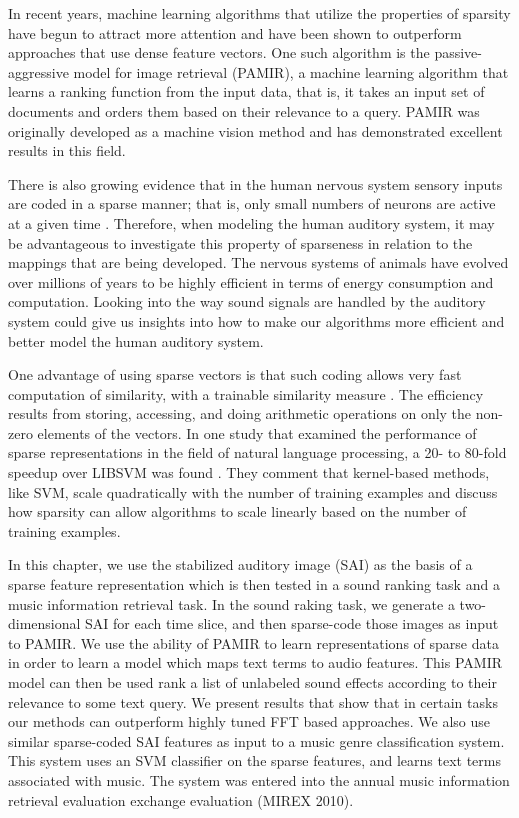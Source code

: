 In recent years, machine learning algorithms that utilize the properties of 
sparsity have begun to attract more attention and have been shown to 
outperform approaches that use dense feature vectors.  One such algorithm is 
the passive-aggressive model for image retrieval (PAMIR), a machine
learning algorithm that learns a ranking function from the input data,
that is, it takes an input set of documents and orders them based on
their relevance to a query. PAMIR was originally developed as a machine
vision method and has demonstrated excellent results in this field.

There is also growing evidence that in the human nervous
system sensory inputs are coded in a sparse manner; that is, only
small numbers of neurons are active at a given time
\cite{olshausen2004}.  Therefore, when modeling the human auditory
system, it may be advantageous to investigate this property of
sparseness in relation to the mappings that are being developed. The
nervous systems of animals have evolved over millions of years to be
highly efficient in terms of energy consumption and computation. 
Looking into the way sound signals are handled by the auditory
system could give us insights into how to make our algorithms more
efficient and better model the human auditory system.

One advantage of using sparse vectors is that such coding allows very fast
computation of similarity, with a trainable similarity measure 
\cite{chechik2010}. The efficiency results from storing, accessing, and doing 
arithmetic operations on only the non-zero elements of the vectors.   
In one study that examined the performance of sparse
representations in the field of natural language processing, a 20- to
80-fold speedup over LIBSVM was found \cite{haffner2006}.  They
comment that kernel-based methods, like SVM, scale quadratically with
the number of training examples and discuss how sparsity can allow
algorithms to scale linearly based on the number of training examples.

In this chapter, we use the stabilized auditory image (SAI) as the basis of a 
sparse feature representation which is then tested in a sound ranking task and 
a music information retrieval task. In the sound raking task, we generate a 
two-dimensional SAI for each time slice, and then sparse-code those images as 
input to PAMIR.  We use the ability of PAMIR to learn representations of 
sparse data in order to learn a model which maps text terms to audio features. 
This PAMIR model can then be used rank a list of unlabeled sound effects 
according to their relevance to some text query. We present results that show 
that in certain tasks our methods can outperform highly tuned FFT based 
approaches. We also use similar sparse-coded SAI features as input to a music 
genre classification system. This system uses an SVM classifier on the sparse
features, and learns text terms associated with music. The system was entered 
into the annual music information retrieval evaluation exchange 
evaluation (MIREX 2010).

